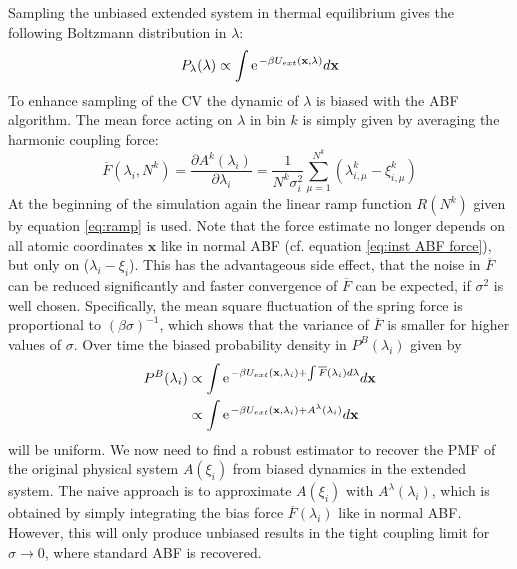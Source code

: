 Sampling the unbiased extended system in thermal equilibrium gives the following Boltzmann distribution in $\lambda$:
\begin{equation}
  P_\lambda(\lambda) \propto \int \e^{-\beta U_{ext}(\textbf{x},\lambda)} d\textbf{x} \\
\end{equation}
To enhance sampling of the CV the dynamic of $\lambda$ is biased with the ABF algorithm.
The mean force acting on $\lambda$ in bin $k$ is simply given by averaging the harmonic coupling force:
\begin{equation}
  \overline{F}(\lambda_{i}, N^k) = \frac{\partial A^{k}(\lambda_{i})}{\partial \lambda_i} = \frac{1}{N^{k}\sigma_i^2} \sum_{\mu=1}^{N^{k}} (\lambda_{i,\mu}^{k}-\xi_{i,\mu}^{k})
  \label{eq:eABF bias}
\end{equation}
At the beginning of the simulation again the linear ramp function $R(N^k)$ given by equation \ref{eq:ramp} is used.
Note that the force estimate no longer depends on all atomic coordinates $\textbf{x}$ like in normal ABF (cf. equation \ref{eq:inst ABF force}), but only on ($\lambda_i - \xi_i$).
This has the advantageous side effect, that the noise in $\overline{F}$ can be reduced significantly and faster convergence of $\overline{F}$ can be expected, if $\sigma^2$ is well chosen.\autocite{lesage2017smoothed} Specifically, the mean square fluctuation of the spring force is proportional to $(\beta\sigma)^{-1}$, which shows that the variance of $\overline{F}$ is smaller for higher values of $\sigma$.
Over time the biased probability density in $P^B(\lambda_i)$ given by
\begin{equation}
  \begin{split}
  P^B(\lambda_i) &\propto \int \e^{-\beta U_{ext}(\textbf{x},\lambda_i) +\int \overline{F}(\lambda_{i})d\lambda} d\textbf{x} \\
  &\propto \int \e^{-\beta U_{ext}(\textbf{x},\lambda_i) +A^\lambda(\lambda_{i})} d\textbf{x}
  \end{split}
\end{equation}
will be uniform.
We now need to find a robust estimator to recover the PMF of the original physical system $A(\xi_i)$ from biased dynamics in the extended system.
The naive approach is to approximate $A(\xi_i)$ with $A^\lambda(\lambda_i)$, which is obtained by simply integrating the bias force $\overline{F}(\lambda_{i})$ like in normal ABF.
However, this will only produce unbiased results in the tight coupling limit for $\sigma \rightarrow 0$, where standard ABF is recovered.

